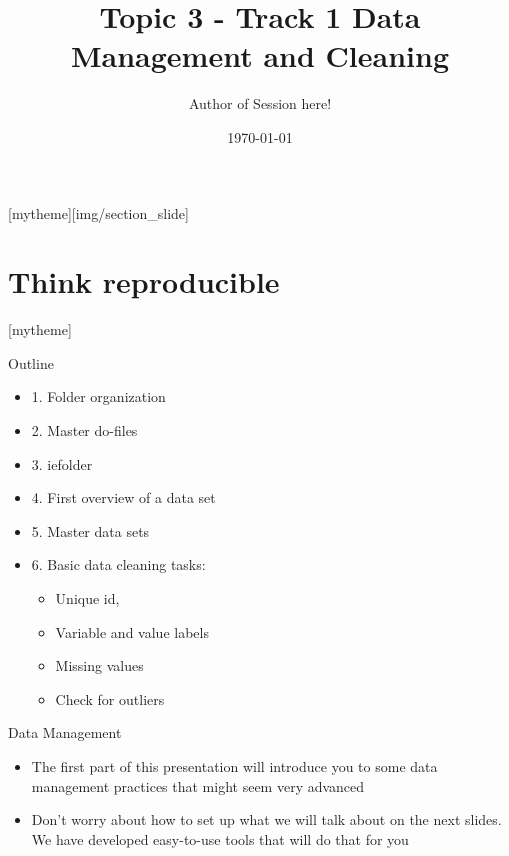 \documentclass[aspectratio=169]{beamer}
\title{Topic 3 - Track 1 \newline Data Management and Cleaning}
\date{\today}
\author{Author of Session here!} %
\institute{Development Impact Evaluation (DIME) \newline The World Bank }
\newcommand{\sectionpic}[2]{
	\setbeamertemplate{section page}[mytheme][#2]
	\section{#1}
	\setbeamertemplate{section page}[mytheme]
}
\begin{document}
	
{
	\maketitle
}

\sectionpic{Think reproducible}{img/section_slide}


\begin{frame}{Outline}
	\begin{itemize}
		\item 1. Folder organization
		\item 2. Master do-files
		\item 3. iefolder
		\item 4. First overview of a data set
		\item 5. Master data sets
		\item 6. Basic data cleaning tasks:
			\begin{itemize}
				\item Unique id, 
				\item Variable and value labels
				\item Missing values
				\item Check for outliers
			\end{itemize}		
	\end{itemize}
\end{frame}


\begin{frame}{Data Management}

\begin{itemize}
	\item The first part of this presentation will introduce you to some data management practices that might seem very advanced
	\item Don’t worry about how to set up what we will talk about on the next slides. We have developed easy-to-use tools that will do that for you
\end{itemize}
\end{frame}
\end{document}
